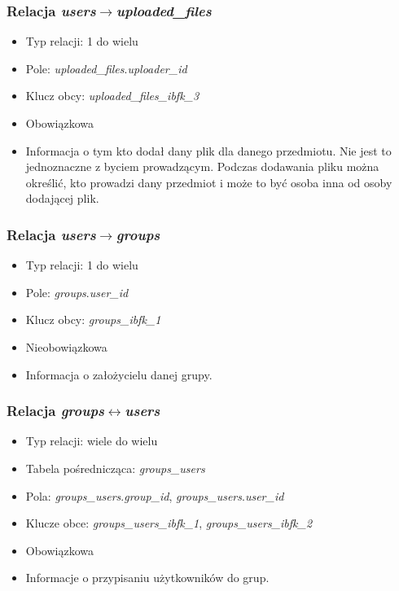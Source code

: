 \documentclass[a4paper,12pt,oneside]{report}
\begin{document}
\subsubsection{Relacja \emph{users}$\to$\emph{uploaded\_files}}
\label{subsub:users-uploaded_files}
\begin{itemize}
  \item Typ relacji: 1 do wielu
  \item Pole: \emph{uploaded\_files}.\emph{uploader\_id}
  \item Klucz obcy: \emph{uploaded\_files\_ibfk\_3}
  \item Obowiązkowa
  \item Informacja o tym kto dodał dany plik dla danego przedmiotu. Nie jest to jednoznaczne z byciem prowadzącym. Podczas dodawania pliku można określić, kto prowadzi dany przedmiot i może to być osoba inna od osoby dodającej plik.
\end{itemize}

\subsubsection{Relacja \emph{users}$\to$\emph{groups}}
\label{subsub:users-groups}
\begin{itemize}
  \item Typ relacji: 1 do wielu
  \item Pole: \emph{groups}.\emph{user\_id}
  \item Klucz obcy: \emph{groups\_ibfk\_1}
  \item Nieobowiązkowa
  \item Informacja o założycielu danej grupy.
\end{itemize}

\subsubsection{Relacja \emph{groups}$\leftrightarrow$\emph{users}}
\label{subsub:groups-users}
\begin{itemize}
  \item Typ relacji: wiele do wielu
  \item Tabela pośrednicząca: \emph{groups\_users}
  \item Pola: \emph{groups\_users}.\emph{group\_id}, \emph{groups\_users}.\emph{user\_id}
  \item Klucze obce: \emph{groups\_users\_ibfk\_1}, \emph{groups\_users\_ibfk\_2}
  \item Obowiązkowa
  \item Informacje o przypisaniu użytkowników do grup.
\end{itemize}
\end{document}

